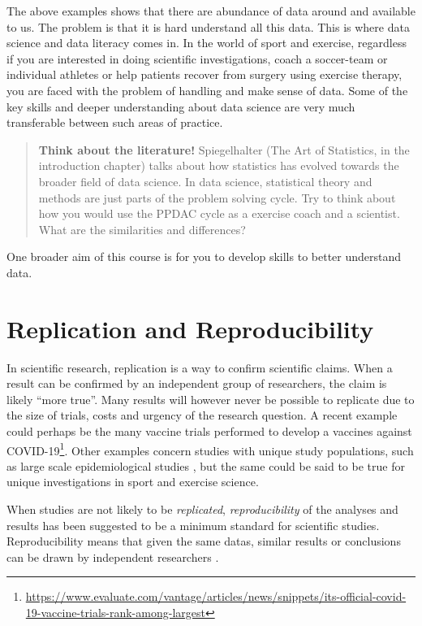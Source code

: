 \documentclass[
  11pt,
]{krantz}
\begin{document}
The above examples shows that there are abundance of data around and available to us. The problem is that it is hard understand all this data. This is where data science and data literacy comes in. In the world of sport and exercise, regardless if you are interested in doing scientific investigations, coach a soccer-team or individual athletes or help patients recover from surgery using exercise therapy, you are faced with the problem of handling and make sense of data. Some of the key skills and deeper understanding about data science are very much transferable between such areas of practice.

\begin{quote}
\textbf{Think about the literature!} Spiegelhalter (The Art of Statistics, in the introduction chapter) talks about how statistics has evolved towards the broader field of data science. In data science, statistical theory and methods are just parts of the problem solving cycle. Try to think about how you would use the PPDAC cycle as a exercise coach and a scientist. What are the similarities and differences?
\end{quote}

One broader aim of this course is for you to develop skills to better understand data.

\hypertarget{replication-and-reproducibility}{%
\section{Replication and Reproducibility}\label{replication-and-reproducibility}}

In scientific research, replication is a way to confirm scientific claims. When a result can be confirmed by an independent group of researchers, the claim is likely ``more true''. Many results will however never be possible to replicate due to the size of trials, costs and urgency of the research question. A recent example could perhaps be the many vaccine trials performed to develop a vaccines against COVID-19\footnote{\url{https://www.evaluate.com/vantage/articles/news/snippets/its-official-covid-19-vaccine-trials-rank-among-largest}}. Other examples concern studies with unique study populations, such as large scale epidemiological studies \citep{RN1492}, but the same could be said to be true for unique investigations in sport and exercise science.

When studies are not likely to be \emph{replicated}, \emph{reproducibility} of the analyses and results has been suggested to be a minimum standard for scientific studies. Reproducibility means that given the same datas, similar results or conclusions can be drawn by independent researchers \citep{RN1492}.
\end{document}
